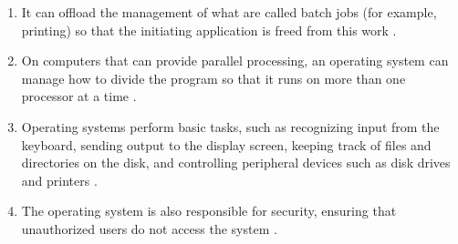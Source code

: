 \documentclass[11pt,a4paper]{article}
\begin{document}
\begin{enumerate}
		\item It can offload the management of what are called batch jobs (for example, printing) so that the initiating application is freed from this work .
		\item On computers that can provide parallel processing, an operating system can manage how to divide the program so that it runs on more than one processor at a time .
		\item Operating systems perform basic tasks, such as recognizing input from the keyboard, sending output to the display screen, keeping track of files and directories on the disk, and controlling peripheral devices such as disk drives and printers .
		\item The operating system is also responsible for security, ensuring that unauthorized users do not access the system .
	\end{enumerate}
	
\end{document}

